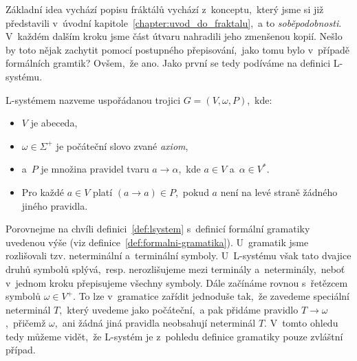 Základní idea vychází popisu fráktálů vychází z~konceptu,~který jsme si již představili v~úvodní kapitole~\ref{chapter:uvod_do_fraktalu},~a to \emph{soběpodobnosti}. V~každém dalším kroku jsme část útvaru nahradili jeho zmenšenou kopií. Nešlo by toto nějak zachytit pomocí postupného přepisování,~jako tomu bylo v~případě formálních gramtik? Ovšem,~že ano. Jako první se tedy podíváme na definici L-systému.
\begin{definition}[L-systém]\label{def:lsystem}
    L-systémem nazveme uspořádanou trojici $G=(V,\omega,P)$,~kde:
    \begin{itemize}
        \item $V$ je abeceda,
        \item $\omega\in\Sigma^+$ je počáteční slovo zvané \emph{axiom},
        \item a~$P$ je množina pravidel tvaru $a\to\alpha$,~kde $a\in V$ a~$\alpha\in V^*$.
        \item Pro každé $a\in V$ platí $(a\to a)\in P$,~pokud $a$ není na levé straně žádného jiného pravidla.
    \end{itemize}
\end{definition}
Porovnejme na chvíli definici~\ref{def:lsystem} s~definicí formální gramatiky uvedenou výše (viz definice~\ref{def:formalni-gramatika}). U~gramatik jsme rozlišovali tzv. neterminální a~terminální symboly. U~L-systému však tato dvajice druhů symbolů splývá,~resp. nerozlišujeme mezi terminály a~neterminály,~neboť v~jednom kroku přepisujeme všechny symboly. Dále začínáme rovnou s~řetězcem symbolů $\omega\in V^+$. To lze v~gramatice zařídit jednoduše tak,~že zavedeme speciální neterminál $T$,~který uvedeme jako počáteční,~a pak přidáme pravidlo $T\to\omega$,~přičemž $\omega$,~ani žádná jiná pravidla neobsahují neterminál $T$. V~tomto ohledu tedy můžeme vidět,~že L-systém je z~pohledu definice gramatiky pouze zvláštní případ.

